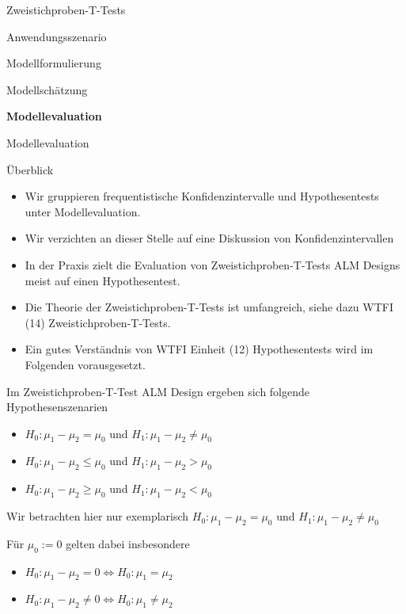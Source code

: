 \documentclass[
  8pt,
  ignorenonframetext,
]{beamer}
\providecommand{\tightlist}{%
  \setlength{\itemsep}{0pt}\setlength{\parskip}{0pt}}
\begin{document}
\begin{frame}{Zweistichproben-T-Tests}
\protect\hypertarget{zweistichproben-t-tests-4}{}
\large
{}
\vfill

Anwendungsszenario

Modellformulierung

Modellschätzung

\textbf{Modellevaluation} \vfill
\end{frame}

\begin{frame}{Modellevaluation}
\protect\hypertarget{modellevaluation-24}{}
\small
{}

Überblick

\footnotesize

\begin{itemize}
\tightlist
\item
  Wir gruppieren frequentistische Konfidenzintervalle und
  Hypothesentests unter Modellevaluation.
\item
  Wir verzichten an dieser Stelle auf eine Diskussion von
  Konfidenzintervallen
\item
  In der Praxis zielt die Evaluation von Zweistichproben-T-Tests ALM
  Designs meist auf einen Hypothesentest.
\item
  Die Theorie der Zweistichproben-T-Tests ist umfangreich, siehe dazu
  WTFI (14) Zweistichproben-T-Tests.
\item
  Ein gutes Verständnis von WTFI Einheit (12) Hypothesentests wird im
  Folgenden vorausgesetzt.
\end{itemize}

Im Zweistichproben-T-Test ALM Design ergeben sich folgende
Hypothesenszenarien

\begin{itemize}
\tightlist
\item
  \(H_0:\mu_1 - \mu_2 = \mu_0\) und \(H_1: \mu_1 - \mu_2 \neq \mu_0\)
\item
  \(H_0:\mu_1 - \mu_2 \le \mu_0\) und \(H_1: \mu_1 - \mu_2 > \mu_0\)
\item
  \(H_0:\mu_1 - \mu_2 \ge \mu_0\) und \(H_1: \mu_1 - \mu_2 < \mu_0\)
\end{itemize}

Wir betrachten hier nur exemplarisch \(H_0:\mu_1 - \mu_2 = \mu_0\) und
\(H_1: \mu_1 - \mu_2 \neq \mu_0\)

Für \(\mu_0 := 0\) gelten dabei insbesondere

\begin{itemize}
\tightlist
\item
  \(H_0:\mu_1 - \mu_2 = 0 \Leftrightarrow H_0: \mu_1 = \mu_2\)
\item
  \(H_0:\mu_1 - \mu_2 \neq 0 \Leftrightarrow H_0: \mu_1 \neq \mu_2\)
\end{itemize}
\end{frame}
\end{document}
